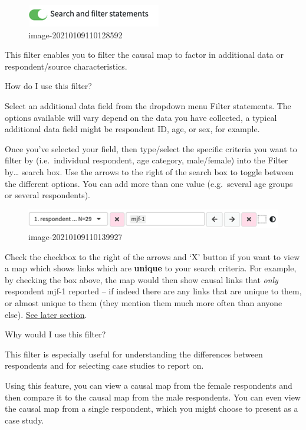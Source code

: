 \documentclass[
]{book}
\begin{document}
\begin{figure}
\centering
\includegraphics{_assets/image-20210109110128592.png}
\caption{image-20210109110128592}
\end{figure}

This filter enables you to filter the causal map to factor in additional data or respondent/source characteristics.

How do I use this filter?

Select an additional data field from the dropdown menu Filter statements. The options available will vary depend on the data you have collected, a typical additional data field might be respondent ID, age, or sex, for example.

Once you've selected your field, then type/select the specific criteria you want to filter by (i.e.~individual respondent, age category, male/female) into the Filter by\ldots{} search box. Use the arrows to the right of the search box to toggle between the different options. You can add more than one value (e.g.~several age groups or several respondents).

\begin{figure}
\centering
\includegraphics{_assets/image-20210109110139927.png}
\caption{image-20210109110139927}
\end{figure}

Check the checkbox to the right of the arrows and `X' button if you want to view a map which shows links which are \textbf{unique} to your search criteria. For example, by checking the box above, the map would then show causal links that \emph{only} respondent mjf-1 reported -- if indeed there are any links that are unique to them, or almost unique to them (they mention them much more often than anyone else). \protect\hyperlink{comparing}{See later section}.

Why would I use this filter?

This filter is especially useful for understanding the differences between respondents and for selecting case studies to report on.

Using this feature, you can view a causal map from the female respondents and then compare it to the causal map from the male respondents. You can even view the causal map from a single respondent, which you might choose to present as a case study.
\end{document}
